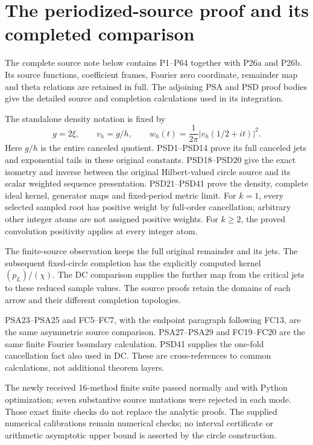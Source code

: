 \documentclass{article}
\begin{document}
\maketitle
\section{The periodized-source proof and its completed comparison}
\label{sec:periodized-source-reader-scope}

The complete source note below contains P1--P64 together with P26a
and P26b. Its source functions, coefficient frames, Fourier zero
coordinate, remainder map and theta relations are retained in full.
The adjoining PSA and PSD proof bodies give the detailed source and
completion calculations used in its integration.

The standalone density notation is fixed by
\[
 g=2\xi,\qquad v_h=g/h,\qquad
 w_h(t)=\frac1{2\pi}|v_h(1/2+it)|^2.
\]
Here $g/h$ is the entire canceled quotient. PSD1--PSD14 prove its
full canceled jets and exponential tails in these original constants.
PSD18--PSD20 give the exact isometry and inverse between the original
Hilbert-valued circle source and its scalar weighted sequence
presentation. PSD21--PSD41 prove the density, complete ideal kernel,
generator maps and fixed-period metric limit. For $k=1$, every selected
sampled root has positive weight by full-order cancellation; arbitrary
other integer atoms are not assigned positive weights. For $k\ge2$,
the proved convolution positivity applies at every integer atom.

The finite-source observation keeps the full original remainder and
its jets. The subsequent fixed-circle completion has the explicitly
computed kernel $(p_L)/(\chi)$. The DC comparison supplies the further
map from the critical jets to these reduced sample values. The source
proofs retain the domains of each arrow and their different completion
topologies.

PSA23--PSA25 and FC5--FC7, with the endpoint paragraph following
FC13, are the same asymmetric source comparison. PSA27--PSA29 and
FC19--FC20 are the same finite Fourier boundary calculation. PSD41
supplies the one-fold cancellation fact also used in DC. These are
cross-references to common calculations, not additional theorem layers.

The newly received 16-method finite suite passed normally and with
Python optimization; seven substantive source mutations were rejected
in each mode. Those exact finite checks do not replace the analytic
proofs. The supplied numerical calibrations remain numerical checks;
no interval certificate or arithmetic asymptotic upper bound is
asserted by the circle construction.
\end{document}
